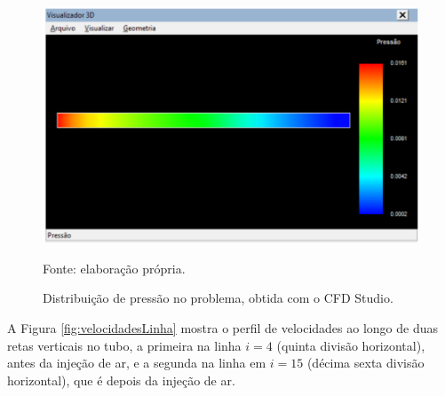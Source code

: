 \begin{figure}[h!]
    \caption{Distribuição de pressão no problema, obtida com o CFD Studio.}
    \label{fig:pressao}
    \centering
    \centerline{\includegraphics[scale=0.45]{pressao.png}}
    \par{Fonte: elaboração própria.}
\end{figure}

A Figura \ref*{fig:velocidadesLinha} mostra o perfil de velocidades ao longo de duas retas
verticais no tubo, a primeira na linha $i = 4$ (quinta divisão horizontal), antes da injeção 
de ar, e a segunda na linha em $i = 15$ (décima sexta divisão horizontal), que é depois
da injeção de ar.

